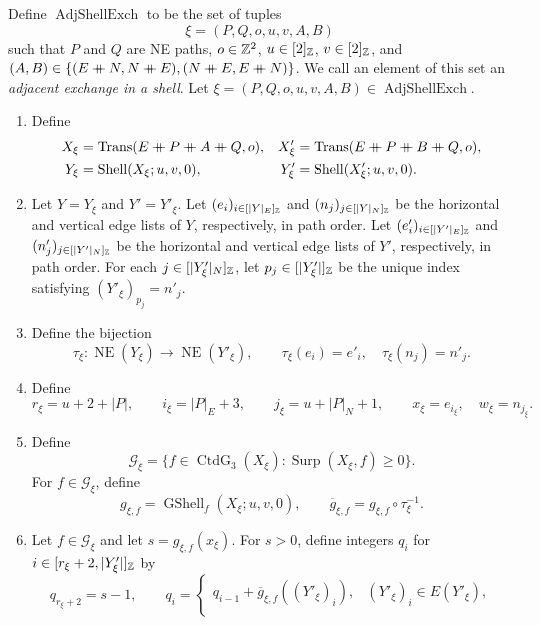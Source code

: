 \begin{definition}\label{def:shell-adjacent-exchange}
Define $\operatorname{AdjShellExch}$ to be the set of tuples
\[
 \xi=(P,Q,o,u,v,A,B)
\]
such that $P$ and $Q$ are NE paths, $o\in\mathbb Z^2$, $u\in[2]_{\mathbb Z}$, $v\in[2]_{\mathbb Z}$, and
$(A,B)\in\{(E\ccn N,N\ccn E),(N\ccn E,E\ccn N)\}$.
We call an element of this set an \textit{adjacent exchange in a shell}.
Let $\xi=(P,Q,o,u,v,A,B)\in\operatorname{AdjShellExch}$.
\begin{enumerate}[font=\itshape]
\item\label{d:adj-shell-exch-paths} Define
\[
\begin{aligned}
 X_\xi&=\operatorname{Trans}(E\ccn P\ccn A\ccn Q,o),& X'_\xi&=\operatorname{Trans}(E\ccn P\ccn B\ccn Q,o),\\
 Y_\xi&=\operatorname{Shell}(X_\xi;u,v,0),&Y'_\xi&=\operatorname{Shell}(X'_\xi;u,v,0).
\end{aligned}
\]
\item\label{d:adj-shell-exch-edges} Let $Y=Y_\xi$ and $Y'=Y'_\xi$. Let $(e_i)_{i\in[|Y|_E]_{\mathbb Z}}$ and $(n_j)_{j\in[|Y|_N]_{\mathbb Z}}$
be the horizontal and vertical edge lists of $Y$, respectively, in path order.
Let $(e'_i)_{i\in[|Y'|_E]_{\mathbb Z}}$ and $(n'_j)_{j\in[|Y'|_N]_{\mathbb Z}}$
be the horizontal and vertical edge lists of $Y'$, respectively, in path order.
For each $j\in[|Y'_\xi|_N]_{\mathbb Z}$, let $p_j\in[|Y'_\xi|]_{\mathbb Z}$ be the unique index satisfying $(Y'_\xi)_{p_j}=n'_j$.
\item\label{d:adj-shell-edge-map} Define the bijection
\[
 \tau_\xi:\operatorname{NE}(Y_\xi)\longrightarrow\operatorname{NE}(Y'_\xi),\qquad
 \tau_\xi(e_i)=e'_i,\quad \tau_\xi(n_j)=n'_j.
\]
\item\label{d:adj-shell-exchanged-edges} Define
\[
 r_\xi=u+2+|P|,\qquad
 i_\xi=|P|_E+3,\qquad j_\xi=u+|P|_N+1,\qquad
 x_\xi=e_{i_\xi},\quad w_\xi=n_{j_\xi}.
\]
\item\label{d:adj-shell-gradings} Define
\[
 \mathcal G_\xi=
 \{f\in\operatorname{CtdG}_3(X_\xi):\operatorname{Surp}(X_\xi,f)\ge0\}.
\]
For $f\in\mathcal G_\xi$, define
\[
 g_{\xi,f}=\operatorname{GShell}_f(X_\xi;u,v,0),\qquad
 \overline g_{\xi,f}=g_{\xi,f}\circ\tau_\xi^{-1}.
\]
\item\label{d:adj-shell-counter} Let $f\in\mathcal G_\xi$ and let $s=g_{\xi,f}(x_\xi)$.
For $s>0$, define integers $q_i$ for $i\in[r_\xi+2,|Y'_\xi|]_{\mathbb Z}$ by
\[
 q_{r_\xi+2}=s-1,\qquad
 q_i=\begin{cases}
 q_{i-1}+\overline g_{\xi,f}((Y'_\xi)_i),&(Y'_\xi)_i\in E(Y'_\xi),\\

\end{cases}\]
\end{enumerate}
\end{definition}
